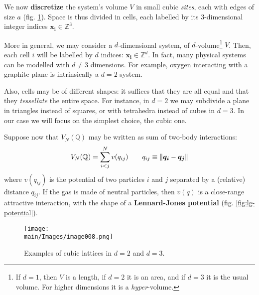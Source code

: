 \documentclass[../../main.tex]{subfiles}
\begin{document}
We now \textbf{discretize} the system's volume $V$ in small cubic \textit{sites}, each with edges of size $a$ (fig. \ref{fig:lattices}). Space is thus divided in cells, each labelled by its $3$-dimensional integer indices $\bm{x_i} \in \mathbb{Z}^3$.

\medskip

More in general, we may consider a $d$-dimensional system, of $d$-volume\footnote{If $d=1$, then $V$ is a length, if $d=2$ it is an area, and if $d=3$ it is the usual volume. For higher dimensions it is a \textit{hyper}-volume.} $V$. Then, each cell $i$ will be labelled by $d$ indices: $\bm{x_i} \in \mathbb{Z}^d$. In fact, many physical systems can be modelled with $d\neq 3$ dimensions. For example, oxygen interacting with a graphite plane is intrinsically a $d=2$ system. 

\medskip

Also, cells may be of different shapes: it suffices that they are all equal and that they \textit{tessellate} the entire space. For instance, in $d=2$ we may subdivide a plane in triangles instead of squares, or with tetrahedra instead of cubes in $d=3$. In our case we will focus on the simplest choice, the cubic one. 

\medskip

Suppose now that $V_N(\mathbb{Q})$ may be written as sum of two-body interactions:
\begin{align} \label{eqn:two-body-potential}
    V_N(\mathbb{Q}) = \sum_{i < j}^N v(q_{ij}) \qquad q_{ij} \equiv \norm{\bm{q_i}- \bm{q_j}}
\end{align}
where $v(q_{ij})$ is the potential of two particles $i$ and $j$ separated by a (relative) distance $q_{ij}$. If the gas is made of neutral particles, then $v(q)$ is a close-range attractive interaction, with the shape of a \textbf{Lennard-Jones potential} (fig. \ref{fig:lg-potential}). 

\begin{figure}[H]
    \centering
    \texttt{[image: \\main/Images/image008.png]}
    \caption{Examples of cubic lattices in $d=2$ and $d=3$.\label{fig:lattices}}
\end{figure}
\end{document}
